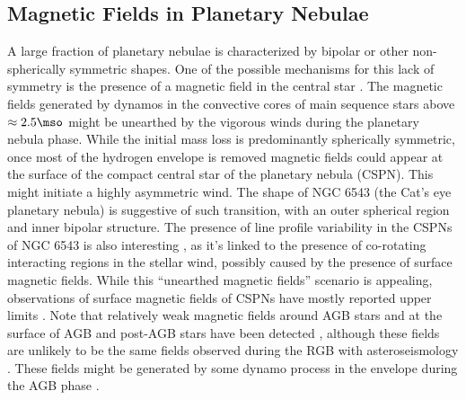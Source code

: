 \subsection{Magnetic Fields in Planetary Nebulae}
A large fraction of planetary nebulae is characterized by bipolar or other non-spherically symmetric shapes. 
One of the possible mechanisms for this lack of symmetry is the presence of a magnetic field in the central star \citep[See e.g.][]{Garc_a_Segura_1997,Chevalier_1994}. The magnetic fields generated by dynamos in the convective cores of main sequence stars above $\approx 2.5\mso$ might be unearthed by the vigorous winds during the planetary nebula phase. While the initial mass loss is predominantly spherically symmetric, once most of the hydrogen envelope is removed magnetic fields could appear at the surface of the compact central star of the planetary nebula (CSPN). This might initiate a highly asymmetric wind. The shape of NGC 6543 (the Cat's eye planetary nebula) is suggestive of such transition, with an outer spherical region and inner bipolar structure. The presence of line profile variability in the CSPNs of NGC 6543 is also interesting \cite{Prinja_2012}, as it's linked to the presence of co-rotating interacting regions in the stellar wind, possibly caused by the presence of surface magnetic fields. While this ``unearthed magnetic fields'' scenario is appealing, observations of surface magnetic fields of CSPNs have mostly reported upper limits \citep{Jordan_2012,Leone_2014,Asensio_Ramos_2014}. Note that relatively weak  magnetic fields around AGB stars \cite{Leal_Ferreira_2013} and at the surface of AGB and post-AGB stars have been detected \cite{L_bre_2014,Sabin_2014}, although these fields are unlikely to be the same fields observed during the RGB with asteroseismology \citep{Fuller_2015}. These fields might be generated by some dynamo process in the envelope during the AGB phase \citep[e.g.][]{Nordhaus_2007}.


